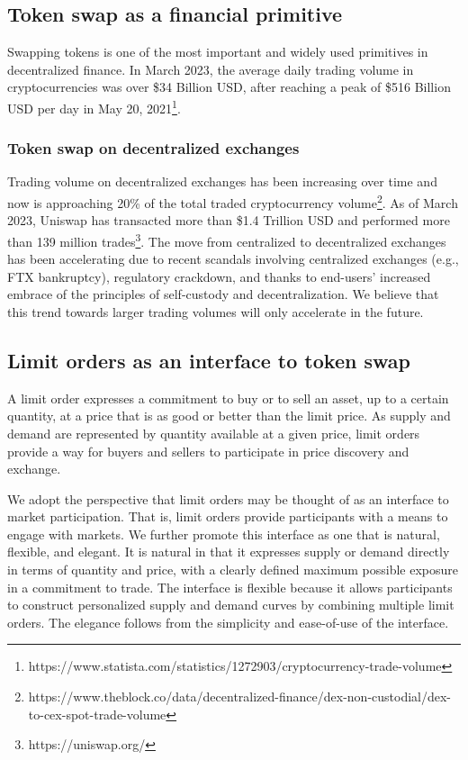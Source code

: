 \documentclass[11pt, reqno]{amsart}
\theoremstyle{definition}
\theoremstyle{remark}
\begin{document}
\subsection{Token swap as a financial primitive}
Swapping tokens is one of the most important and widely used primitives in
decentralized finance.
In March 2023, the average daily trading volume in cryptocurrencies was over
\$34 Billion USD, after reaching a peak of \$516 Billion USD per day in May 20,
2021\footnote{https://www.statista.com/statistics/1272903/cryptocurrency-trade-volume}.


\subsubsection{Token swap on decentralized exchanges}
Trading volume on decentralized exchanges has been increasing over time and now
is approaching 20\% of the total traded cryptocurrency
volume\footnote{https://www.theblock.co/data/decentralized-finance/dex-non-custodial/dex-to-cex-spot-trade-volume}.
As of March 2023, Uniswap has transacted more than \$1.4 Trillion USD and
performed more than 139 million trades\footnote{https://uniswap.org/}.
The move from centralized to decentralized exchanges has been accelerating due
to recent scandals involving centralized exchanges (e.g., FTX bankruptcy),
regulatory crackdown, and thanks to end-users' increased embrace of the
principles of self-custody and decentralization.
We believe that this trend towards larger trading volumes will only accelerate
in the future.

\subsection{Limit orders as an interface to token swap}
A limit order expresses a commitment to buy or to sell an asset, up to
a certain quantity, at a price that is as good or better than the limit price.
As supply and demand are represented by quantity available at a given price,
limit orders provide a way for buyers and sellers to participate in price
discovery and exchange.

We adopt the perspective that limit orders may be thought of as an interface
to market participation. That is, limit orders provide participants with a
means to engage with markets. We further promote this interface as one that
is natural, flexible, and elegant. It is natural in that it expresses
supply or demand directly in terms of quantity and price, with a clearly
defined maximum possible exposure in a commitment to trade. The interface is
flexible because it allows participants to construct personalized supply and
demand curves by combining multiple limit orders. The elegance follows from the
simplicity and ease-of-use of the interface.
\end{document}
